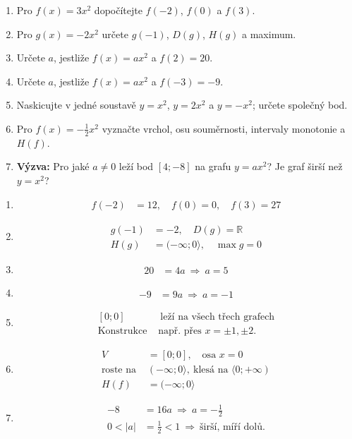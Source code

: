 \documentclass[11pt,a4paper]{article}
\begin{document}
\begin{zadaniReseniBox}[title={Domácí úkol}]
\begin{enumerate}[label=\alph*),itemsep=3pt]
\item Pro $f(x)=3x^2$ dopočítejte $f(-2)$, $f(0)$ a $f(3)$.
\item Pro $g(x)=-2x^2$ určete $g(-1)$, $D(g)$, $H(g)$ a maximum.
\item Určete $a$, jestliže $f(x)=ax^2$ a $f(2)=20$.
\item Určete $a$, jestliže $f(x)=ax^2$ a $f(-3)=-9$.
\item Naskicujte v jedné soustavě $y=x^2$, $y=2x^2$ a $y=-x^2$; určete společný bod.
\item Pro $f(x)=-\tfrac12 x^2$ vyznačte vrchol, osu souměrnosti, intervaly monotonie a $H(f)$.
\item \textbf{Výzva:} Pro jaké $a\ne0$ leží bod $[4;-8]$ na grafu $y=ax^2$? Je graf širší než $y=x^2$?
\end{enumerate}
\tcblower
\begin{enumerate}[label=\alph*),itemsep=4pt]
\item
\[
\begin{aligned}
f(-2)&=12,\quad f(0)=0,\quad f(3)=27
\end{aligned}
\]

\item
\[
\begin{aligned}
g(-1)&=-2,\quad D(g)=\mathbb R \\
H(g)&=(-\infty;0\rangle,\quad \max g=0
\end{aligned}
\]

\item
\[
\begin{aligned}
20&=4a\ \Rightarrow\ a=5
\end{aligned}
\]

\item
\[
\begin{aligned}
-9&=9a\ \Rightarrow\ a=-1
\end{aligned}
\]

\item
\[
\begin{aligned}
[0;0]&\ \text{leží na všech třech grafech} \\
\text{Konstrukce }&\text{např. přes }x=\pm1,\pm2.
\end{aligned}
\]

\item
\[
\begin{aligned}
V&=[0;0],\quad\text{osa }x=0 \\
\text{roste na }&(-\infty;0\rangle,\ \text{klesá na }\langle0;+\infty) \\
H(f)&=(-\infty;0\rangle
\end{aligned}
\]

\item
\[
\begin{aligned}
-8&=16a\ \Rightarrow\ a=-\tfrac12 \\
0<|a|&=\tfrac12<1\ \Rightarrow\ \text{širší, míří dolů.}
\end{aligned}
\]

\end{enumerate}
\end{zadaniReseniBox}
\end{document}
